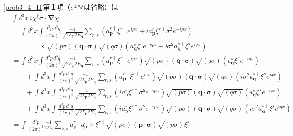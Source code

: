 \eqref{prob3_4_H}第１項（$e^{\pm p_0t}$は省略）は
\begin{align*}
  & \int d^3x \, i \chi^\dagger \boldsymbol{\sigma} \cdot \boldsymbol{\nabla} \chi \\
  & = \int d^3x \int \frac{d^3p\, d^3q}{(2\pi)^6} \frac{-1}{\sqrt{2E_{\boldsymbol{p}} 2 E_{\boldsymbol{q}}}}
  \sum_{r, s} \left( a_{\boldsymbol{p}}^{r\dagger} \xi^{r\dagger} e^{ipx} + i a_{\boldsymbol{p}}^{r} \xi^{r\dagger} \sigma^2 e^{-ipx} \right) \\
  & \qquad \qquad \times \sqrt{(p \sigma)} (\boldsymbol{q} \cdot \boldsymbol{\sigma}) \sqrt{(q \sigma)}
  \left( a_{\boldsymbol{q}}^s \xi^s e^{-iqx} + i \sigma^2 a_{\boldsymbol{q}}^{s\dagger} \xi^s e^{iqx} \right) \\
  & = \int d^3x \int \frac{d^3p\, d^3q}{(2\pi)^6} \frac{-1}{\sqrt{2E_{\boldsymbol{p}} 2 E_{\boldsymbol{q}}}}
  \sum_{r, s} \left( a_{\boldsymbol{p}}^{r\dagger} \xi^{r\dagger} e^{ipx} \right)
  \sqrt{(p \sigma)} (\boldsymbol{q} \cdot \boldsymbol{\sigma}) \sqrt{(q \sigma)}
  \left( a_{\boldsymbol{q}}^s \xi^s e^{-iqx} \right) \\
  & \qquad + \int d^3x \int \frac{d^3p\, d^3q}{(2\pi)^6} \frac{-1}{\sqrt{2E_{\boldsymbol{p}} 2 E_{\boldsymbol{q}}}}
  \sum_{r, s} \left( a_{\boldsymbol{p}}^{r\dagger} \xi^{r\dagger} e^{ipx} \right)
  \sqrt{(p \sigma)} (\boldsymbol{q} \cdot \boldsymbol{\sigma}) \sqrt{(q \sigma)}
  \left( i \sigma^2 a_{\boldsymbol{q}}^{s\dagger} \xi^s e^{iqx} \right) \\
  & \qquad + \int d^3x \int \frac{d^3p\, d^3q}{(2\pi)^6} \frac{-1}{\sqrt{2E_{\boldsymbol{p}} 2 E_{\boldsymbol{q}}}}
  \sum_{r, s} \left( i a_{\boldsymbol{p}}^{r} \xi^{r\dagger} \sigma^2 e^{-ipx} \right)
  \sqrt{(p \sigma)} (\boldsymbol{q} \cdot \boldsymbol{\sigma}) \sqrt{(q \sigma)}
  \left( a_{\boldsymbol{q}}^s \xi^s e^{-iqx}\right) \\
  & \qquad + \int d^3x \int \frac{d^3p\, d^3q}{(2\pi)^6} \frac{-1}{\sqrt{2E_{\boldsymbol{p}} 2 E_{\boldsymbol{q}}}}
  \sum_{r, s} \left( i a_{\boldsymbol{p}}^{r} \xi^{r\dagger} \sigma^2 e^{-ipx} \right)
  \sqrt{(p \sigma)} (\boldsymbol{q} \cdot \boldsymbol{\sigma}) \sqrt{(q \sigma)}
  \left( i \sigma^2 a_{\boldsymbol{q}}^{s\dagger} \xi^s e^{iqx} \right) \\
  & = \int \frac{d^3p}{(2\pi)^3} \frac{-1}{2E_{\boldsymbol{p}}}
  \sum_{r, s} a_{\boldsymbol{p}}^{r\dagger} a_{\boldsymbol{p}}^s \times \xi^{r\dagger} \sqrt{(p \sigma)}
  (\boldsymbol{p} \cdot \boldsymbol{\sigma}) \sqrt{(p \sigma)} \xi^s \\

\end{align*}
